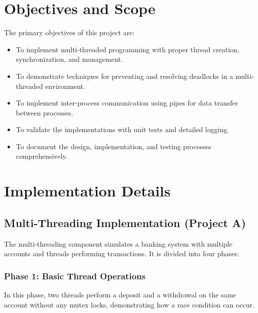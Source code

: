 \documentclass[11pt]{article}
\begin{document}
\section{Objectives and Scope}
The primary objectives of this project are:
\begin{itemize}[itemsep=0pt]
    \item To implement multi-threaded programming with proper thread creation, synchronization, and management.
    \item To demonstrate techniques for preventing and resolving deadlocks in a multi-threaded environment.
    \item To implement inter-process communication using pipes for data transfer between processes.
    \item To validate the implementations with unit tests and detailed logging.
    \item To document the design, implementation, and testing processes comprehensively.
\end{itemize}

\section{Implementation Details}

\subsection{Multi-Threading Implementation (Project A)}
The multi-threading component simulates a banking system with multiple accounts and threads performing transactions. It is divided into four phases:

\subsubsection{Phase 1: Basic Thread Operations}
In this phase, two threads perform a deposit and a withdrawal on the same account without any mutex locks, demonstrating how a race condition can occur.
\end{document}
